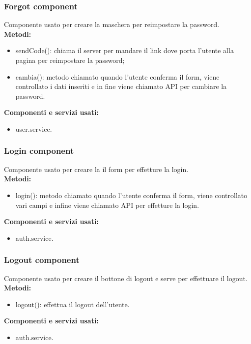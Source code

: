 \subsubsection{Forgot component}
Componente usato per creare la maschera per reimpostare la password.\\
\textbf{Metodi:}
\begin{itemize}
    \item sendCode(): chiama il server per mandare il link dove porta l'utente alla pagina per reimpostare la password;
    \item cambia(): metodo chiamato quando l'utente conferma il form, viene controllato i dati inseriti e in fine viene chiamato API per cambiare la password.
\end{itemize}
\textbf{Componenti e servizi usati:}
\begin{itemize}
    \item user.service.
\end{itemize}

\subsubsection{Login component}
Componente usato per creare la il form per effetture la login.\\
\textbf{Metodi:}
\begin{itemize}
    \item login(): metodo chiamato quando l'utente conferma il form, viene controllato vari campi e infine viene chiamato API per effetture la login.
\end{itemize}
\textbf{Componenti e servizi usati:}
\begin{itemize}
    \item auth.service.
\end{itemize}

\subsubsection{Logout component}
Componente usato per creare il bottone di logout e serve per effettuare il logout.\\
\textbf{Metodi:}
\begin{itemize}
    \item logout(): effettua il logout dell'utente.
\end{itemize}
\textbf{Componenti e servizi usati:}
\begin{itemize}
    \item auth.service.
\end{itemize}

